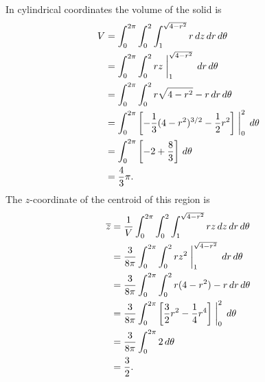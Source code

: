 \begin{exercises}
\begin{exerciseSolution}
	\ba
	\item In cylindrical coordinates the volume of the solid is  
\begin{align*}
V &= \int_0^{2\pi} \int_0^{2} \int_{1}^{\sqrt{4-r^2}} r \, dz \, dr \, d\theta \\
	&= \int_0^{2\pi} \int_0^{2} rz\biggm|_{1}^{\sqrt{4-r^2}}  \, dr \, d\theta \\
	&= \int_0^{2\pi} \int_0^{2} r\sqrt{4-r^2} - r  \, dr \, d\theta \\
	&= \int_0^{2\pi} \left[-\frac{1}{3}(4-r^2)^{3/2}-\frac{1}{2}r^2\right]\biggm|_0^{2}  \, d\theta \\
	&= \int_0^{2\pi}  \left[-2+\frac{8}{3}\right] \, d\theta \\
	&= \frac{4}{3}\pi.
\end{align*}
The $z$-coordinate of the centroid of this region is 
\begin{align*}
\overline{z} &= \frac{1}{V} \int_0^{2\pi} \int_0^{2} \int_{1}^{\sqrt{4-r^2}} rz \, dz \, dr \, d\theta \\
	&= \frac{3}{8\pi} \int_0^{2\pi} \int_0^{2} rz^2\biggm|_{1}^{\sqrt{4-r^2}}  \, dr \, d\theta \\
	&= \frac{3}{8\pi} \int_0^{2\pi} \int_0^{2} r(4-r^2) - r  \, dr \, d\theta \\
	&= \frac{3}{8\pi} \int_0^{2\pi} \left[\frac{3}{2}r^2- \frac{1}{4}r^4\right]\biggm|_0^{2}  \, d\theta \\
	&= \frac{3}{8\pi} \int_0^{2\pi}  2 \, d\theta \\
	&= \frac{3}{2}.
\end{align*}



\end{exerciseSolution}
\end{exercises}
